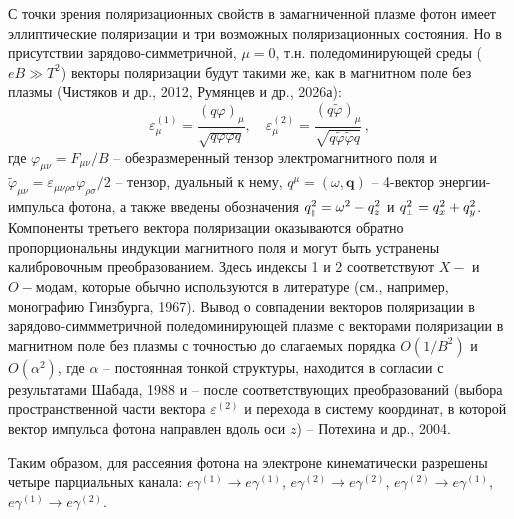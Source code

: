 \documentclass{pazh2col-win}
\let\vec=\mathbf
\def\mprp{\mbox{\tiny $\bot$}}
\def\mprl{\mbox{\tiny $\|$}}
\begin{document}
С точки зрения поляризационных свойств в замагниченной плазме фотон имеет эллиптические поляризации и три возможных поляризационных состояния. Но в присутствии зарядово-симметричной, $\mu = 0$, т.н. поледоминирующей среды ($eB\gg T^2$) векторы поляризации будут такими же, как в магнитном поле без плазмы (Чистяков и др., 2012, Румянцев и др., 2026а):
%
\begin{equation}
\label{eps}
\varepsilon^{(1)}_\mu=\frac{(q\varphi )_\mu}{\sqrt{q\varphi\varphi q}} ,\quad
\varepsilon^{(2)}_\mu=\frac{(q\tilde{\varphi})_\mu}{\sqrt{q\tilde{\varphi}\tilde{\varphi} q}}\, ,
\end{equation}
 где $\varphi_{\mu \nu} =  F_{\mu \nu} /B$ -- обезразмеренный тензор электромагнитного поля и ${\tilde \varphi}_{\mu \nu} = \varepsilon_{\mu \nu \rho \sigma} \varphi_{\rho \sigma}/2$ -- тензор, дуальный к нему,  $q^\mu = (\omega, \vec{q})$ -- 4-вектор энергии-импульса фотона, а также введены обозначения $q_{\mprl}^2 = \omega^2 - q_z^2$ и $q_{\mprp}^2 = q_x^2 + q_y^2$. Компоненты третьего вектора поляризации оказываются обратно пропорциональны индукции магнитного поля и могут быть устранены калибровочным преобразованием. Здесь индексы 1 и 2 соответствуют $X-$ и $O-$модам, которые обычно используются в литературе (см., например, монографию Гинзбурга, 1967). Вывод о совпадении векторов поляризации в зарядово-симмметричной поледоминирующей плазме с векторами поляризации в магнитном поле без плазмы с точностью до слагаемых порядка $O(1/B^2)$ и $O(\alpha^2)$, где $\alpha$ -- постоянная тонкой структуры, находится в согласии с результатами Шабада, 1988 и -- после соответствующих преобразований (выбора пространственной части вектора $\varepsilon^{(2)}$ и перехода в систему координат, в которой вектор импульса фотона направлен вдоль оси $z$) -- Потехина и др., 2004.

Таким образом, для рассеяния фотона на электроне кинематически разрешены четыре парциальных канала: $e\gamma^{(1)}\to e\gamma^{(1)}$, $e\gamma^{(2)}\to e\gamma^{(2)}$, $e\gamma^{(2)}\to e\gamma^{(1)}$, $e\gamma^{(1)}\to e\gamma^{(2)}$.
\end{document}
